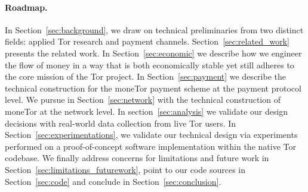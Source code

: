 \paragraph*{Roadmap.} In Section~\ref{sec:background}, we draw on technical preliminaries from two distinct fields: applied Tor research and payment channels. Section~\ref{sec:related_work} presents the related work. In Section~\ref{sec:economic} we describe how we engineer the flow of money in a way that is both economically stable yet still adheres to the core mission of the Tor project. In Section~\ref{sec:payment} we
describe the technical construction for the moneTor payment scheme at the payment protocol level. We pursue in Section~\ref{sec:network} with the technical construction of moneTor at the network level. In section~\ref{sec:analysis} we  validate our design decisions with real-world data collection from live Tor users.
In Section~\ref{sec:experimentations}, we validate our technical design via experiments performed on a proof-of-concept software implementation within the native Tor codebase. We finally address concerns for limitations and future work in Section~\ref{sec:limitations_futurework}, point to our code sources in Section~\ref{sec:code} and conclude in Section~\ref{sec:conclusion}.

